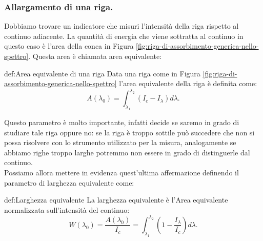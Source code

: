 \subsubsection{Allargamento di una riga.}
\label{subsubsec:Allargamento di una riga.}
Dobbiamo trovare un indicatore che misuri l'intensità della riga rispetto al continuo adiacente. La quantità di energia che viene sottratta al continuo in questo caso è l'area della conca in Figura \ref{fig:riga-di-assorbimento-generica-nello-spettro}. Questa area è chiamata area equivalente:
\begin{defn}{def:Area equivalente di una riga}
	Data una riga come in Figura \ref{fig:riga-di-assorbimento-generica-nello-spettro} l'area equivalente della riga è definita come:
\[
	A( \lambda_0) = \int_{\lambda_1}^{\lambda_2} \left( I_{c}-I_{\lambda} \right) d\lambda  
.\]
\end{defn}
Questo parametro è molto importante, infatti decide se saremo in grado di studiare tale riga oppure no: se la riga è troppo sottile può succedere che non si possa risolvere con lo strumento utilizzato per la misura, analogamente se abbiamo righe troppo larghe potremmo non essere in grado di distinguerle dal continuo.\\
Possiamo allora mettere in evidenza quest'ultima affermazione definendo il parametro di larghezza equivalente come:
\begin{defn}{def:Larghezza equivalente}
	La larghezza equivalente è l'Area equivalente normalizzata sull'intensità del continuo:
	\[
	W( \lambda_0) = \frac{A( \lambda_0) }{I_{c}}= 
	\int_{\lambda_1}^{\lambda_2} \left( 1 - \frac{I_{\lambda} }{I_{c}}\right)d\lambda 
.\] 
\end{defn}
